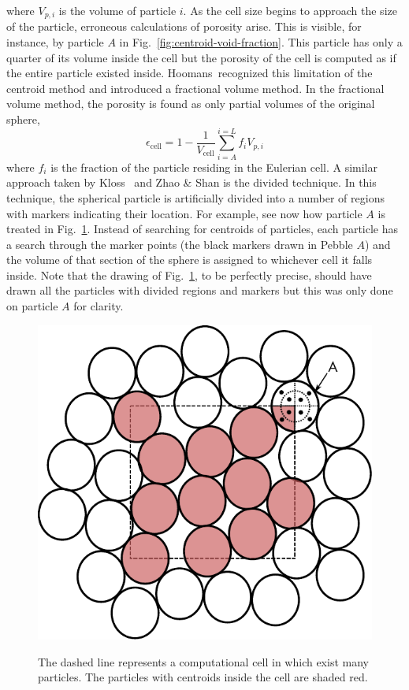 where $V_{p,i}$ is the volume of particle $i$. As the cell size begins to approach the size of the particle, erroneous calculations of porosity arise. This is visible, for instance, by particle $A$ in Fig.~\ref{fig:centroid-void-fraction}. This particle has only a quarter of its volume inside the cell but the porosity of the cell is computed as if the entire particle existed inside. Hoomans\etal~recognized this limitation of the centroid method and introduced a fractional volume method.\cite{Hoomans1996} In the fractional volume method, the porosity is found as only partial volumes of the original sphere,
\begin{equation}
	\epsilon_\text{cell} = 1-\frac{1}{V_\text{cell}}\sum_{i = A}^{i=L}f_iV_{p,i}
\end{equation}
where $f_i$ is the fraction of the particle residing in the Eulerian cell. A similar approach taken by Kloss\etal~ and Zhao \& Shan is the divided technique.\cite{Kloss2012,Zhao2013a} In this technique, the spherical particle is artificially divided into a number of regions with markers indicating their location. For example, see now how particle $A$ is treated in Fig.~\ref{fig:centroid-void-fraction-divided}. Instead of searching for centroids of particles, each particle has a search through the marker points (the black markers drawn in Pebble $A$) and the volume of that section of the sphere is assigned to whichever cell it falls inside. Note that the drawing of Fig.~\ref{fig:centroid-void-fraction-divided}, to be perfectly precise, should have drawn all the particles with divided regions and markers but this was only done on particle $A$ for clarity.
\begin{figure}[t]
	\centering
	\caption{The dashed line represents a computational cell in which exist many particles. The particles with centroids inside the cell are shaded red.}
	\includegraphics[width=\singleimagewidth]{chapters/figures/void-fraction-divided-cell.pdf}\label{fig:centroid-void-fraction-divided}
\end{figure}

